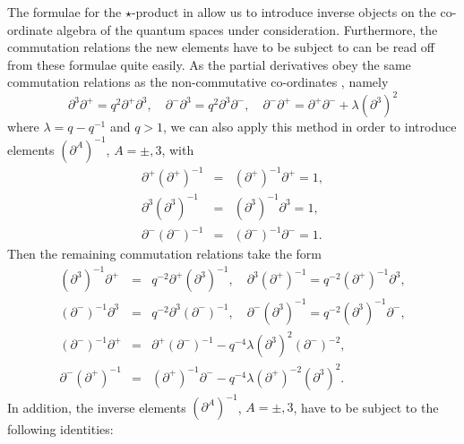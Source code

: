 \documentclass[a4paper,11pt,oneside]{article}
\begin{document}
The formulae for the $\star$-product in \cite{WW01} allow us to
introduce inverse objects on the
co-ordinate algebra of the quantum spaces under consideration. Furthermore, the commutation
relations the new elements have to be subject to can be read off
from these formulae quite easily. As the partial derivatives obey the
same commutation relations as the non-commutative co-ordinates \cite{LWW97},
namely 
\begin{equation}
\partial ^{3}\partial ^{+}=q^{2}\partial ^{+}\partial ^{3},\quad \partial
^{-}\partial ^{3}=q^{2}\partial ^{3}\partial ^{-},\quad \partial
^{-}\partial ^{+}=\partial ^{+}\partial ^{-}+\lambda \left( \partial
^{3}\right) ^{2}
\end{equation}
where $\lambda =q-q^{-1}$ and $q>1$, we can also apply this method in order
to introduce elements $\left( \partial ^{A}\right) ^{-1}$, $A=\pm ,3$, with 
\begin{eqnarray}
\partial ^{+}\left( \partial ^{+}\right) ^{-1} &=&\left( \partial
^{+}\right) ^{-1}\partial ^{+}=1, \\
\partial ^{3}\left( \partial ^{3}\right) ^{-1} &=&\left( \partial
^{3}\right) ^{-1}\partial ^{3}=1,  \nonumber \\
\partial ^{-}\left( \partial ^{-}\right) ^{-1} &=&\left( \partial
^{-}\right) ^{-1}\partial ^{-}=1.  \nonumber
\end{eqnarray}
Then the remaining commutation relations take the form 
\begin{eqnarray}
\left( \partial ^{3}\right) ^{-1}\partial ^{+} &=&q^{-2}\partial ^{+}\left(
\partial ^{3}\right) ^{-1},\quad \partial ^{3}\left( \partial ^{+}\right)
^{-1}=q^{-2}\left( \partial ^{+}\right) ^{-1}\partial ^{3}, \\
\left( \partial ^{-}\right) ^{-1}\partial ^{3} &=&q^{-2}\partial ^{3}\left(
\partial ^{-}\right) ^{-1},\quad \partial ^{-}\left( \partial ^{3}\right)
^{-1}=q^{-2}\left( \partial ^{3}\right) ^{-1}\partial ^{-},  \nonumber \\
\left( \partial ^{-}\right) ^{-1}\partial ^{+} &=&\partial ^{+}\left(
\partial ^{-}\right) ^{-1}-q^{-4}\lambda \left( \partial ^{3}\right)
^{2}\left( \partial ^{-}\right) ^{-2},  \nonumber \\
\partial ^{-}\left( \partial ^{+}\right) ^{-1} &=&\left( \partial
^{+}\right) ^{-1}\partial ^{-}-q^{-4}\lambda \left( \partial ^{+}\right)
^{-2}\left( \partial ^{3}\right) ^{2}.  \nonumber
\end{eqnarray}
In addition, the inverse elements $\left( \partial ^{A}\right) ^{-1}$, $%
A=\pm ,3$, have to be subject to the following identities: 
\end{document}

